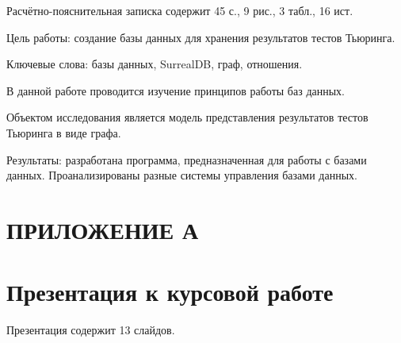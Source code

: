




    \normalsize




Расчётно-пояснительная записка содержит 45 с., 9 рис., 3 табл., 16 ист.

Цель работы: создание базы данных для хранения результатов тестов Тьюринга.

Ключевые слова: базы данных, SurrealDB, граф, отношения.

В данной работе проводится изучение принципов работы баз данных.

Объектом исследования является модель представления результатов тестов Тьюринга в виде графа.

Результаты: разработана программа, предназначенная для работы с базами данных. Проанализированы разные системы управления базами данных.

\pagebreak

\newpage
\renewcommand{\contentsname}{\normalsize\bfseries\centering СОДЕРЖАНИЕ}
    \tableofcontents
    \normalsize













\section*{\centering ПРИЛОЖЕНИЕ А}

\section*{Презентация к курсовой работе}
Презентация содержит 13 слайдов.

